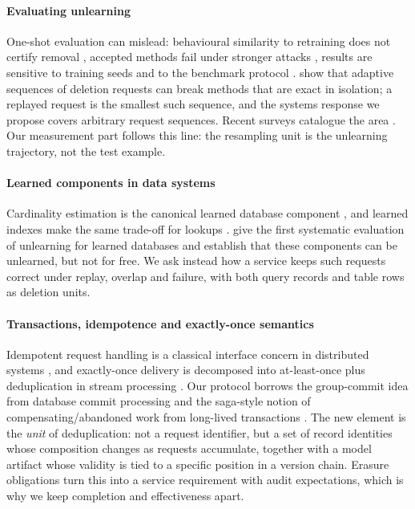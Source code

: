 \documentclass[conference]{IEEEtran}
\begin{document}
\paragraph{Evaluating unlearning}
One-shot evaluation can mislead: behavioural similarity to retraining does not
certify removal \cite{thudi2022necessity}, accepted methods fail under stronger
attacks \cite{hayes2025inexact,pawelczyk2025machine}, results are sensitive to
training seeds \cite{lanyon2025importance} and to the benchmark protocol
\cite{cadet2025deep}.  \cite{gupta2021adaptive} show that adaptive sequences of
deletion requests can break methods that are exact in isolation; a replayed request
is the smallest such sequence, and the systems response we propose covers arbitrary
request sequences.  Recent surveys catalogue the area \cite{nguyen2025survey}.  Our
measurement part follows this line: the resampling unit is the unlearning trajectory,
not the test example.

\paragraph{Learned components in data systems}
Cardinality estimation is the canonical learned database component
\cite{kipf2019learned,yang2020deep,hilprecht2020deepdb,wang2021are}, and learned
indexes make the same trade-off for lookups \cite{kraska2018case}.
\cite{kurmanji2024machine} give the first systematic evaluation of unlearning for
learned databases and establish that these components can be unlearned, but not for
free.  We ask instead how a service keeps such requests correct under replay, overlap
and failure, with both query records and table rows as deletion units.

\paragraph{Transactions, idempotence and exactly-once semantics}
Idempotent request handling is a classical interface concern in distributed systems
\cite{helland2012idempotence}, and exactly-once delivery is decomposed into
at-least-once plus deduplication in stream processing \cite{carbone2015apache}.  Our
protocol borrows the group-commit idea from database commit processing and the
saga-style notion of compensating/abandoned work from long-lived transactions
\cite{gray1981transaction,weikum2001transactional,garciaMolina1987sagas}.  The new element is the \emph{unit} of
deduplication: not a request identifier, but a set of record identities whose
composition changes as requests accumulate, together with a model artifact whose
validity is tied to a specific position in a version chain.  Erasure obligations
\cite{europeanparliament2016regulation,mayerSchonberger2009delete} turn this into a
service requirement with audit expectations, which is why we keep completion and
effectiveness apart.
\end{document}

